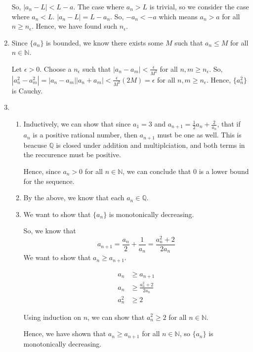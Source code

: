 \documentclass[12pt]{article}
\begin{document}
\begin{enumerate}[start=1,label={\bfseries Problem \arabic*:},leftmargin=1in]
    So, $\left|  a_{n} - L \right| < L - a$. 
    The case where $a_{n} > L$ is trivial, so we consider the case where $a_{n} < L$. 
    $\left| a_{n} - L \right| = L - a_{n}$. 
    So, $-a_{n} < -a$ which means $a_{n} > a$ for all $n \geq n_{\epsilon}$. Hence, we have found such $n_{\epsilon}$.

    \item Since $\{a_{n}\}$ is bounded, we know there exists some $M$ such that $a_{n} \leq M$ for all $n \in \mathbb{N}$.
    
    Let $\epsilon > 0$. Choose a $n_{\epsilon}$ such that $|a_{n} - a_{m}| < \frac{\epsilon}{M^{2}}$ for all $n, m \geq n_{\epsilon}$.
    So, $|a_{n}^2 - a_{m}^2| = |a_{n} - a_{m}||a_{n} + a_{m}| < \frac{\epsilon}{M^{2}}(2M) = \epsilon$ for all $n, m \geq n_{\epsilon}$. Hence, $\{a_{n}^{2}\}$ is Cauchy.

    \item 
    \begin{enumerate}
        \item Inductively, we can show that since $a_{1} = 3$ and $a_{n+1} = \frac{1}{2}a_{n} + \frac{2}{a_{n}}$, that if $a_{n}$ is a positive rational number, then $a_{n+1}$ must be one as well. 
        This is beacuse $\mathbb{Q}$ is closed under addition and multiplciation, and both terms in the reccurence must be positive.

        Hence, since $a_{n} > 0$ for all $n \in \mathbb{N}$, we can conclude that 0 is a lower bound for the sequence.
        \item By the above, we know that each $a_{n} \in \mathbb{Q}$. 
        \item We want to show that $\{a_{n}\}$ is monotonically decreasing. 
        
        So, we know that 
        \[
            a_{n+1} = \frac{a_{n}}{2} + \frac{1}{a_{n}} = \frac{a_{n}^{2} + 2}{2a_{n}}
        \]
        We want to show that $a_{n} \geq a_{n+1}$. 

        \begin{align*}
            a_{n} &\geq a_{n+1}\\ 
            a_{n} &\geq \frac{a_{n}^{2} + 2}{2a_{n}}\\
            a_{n}^{2} &\geq 2
        \end{align*}
        
        Using induction on $n$, we can show that $a_{n}^{2} \geq 2$ for all $n \in \mathbb{N}$. 

        Hence, we have shown that $a_{n} \geq a_{n+1}$ for all $n \in \mathbb{N}$, so $\{ a_{n} \}$ is monotonically decreasing.


\end{enumerate}
\end{enumerate}
\end{document}
